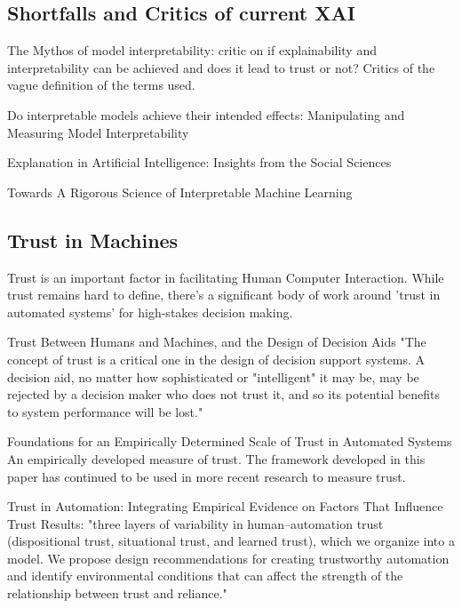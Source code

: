 \documentclass[manuscript,screen,review]{acmart}
\begin{document}
\subsection{Shortfalls and Critics of current XAI}
The Mythos of model interpretability\cite{Lipton2018}: critic on if explainability and interpretability can be achieved and does it lead to trust or not? Critics of the vague definition of the terms used.

Do interpretable models achieve their intended effects: Manipulating and Measuring Model Interpretability\cite{Goldstein2021}

Explanation in Artificial Intelligence: Insights from the Social Sciences\cite{Miller2019}

Towards A Rigorous Science of Interpretable Machine Learning\cite{Doshi-Velez2017}


\subsection{Trust in Machines}
Trust is an important factor in facilitating Human Computer Interaction. While trust remains hard to define, there's a significant body of work around 'trust in automated systems' for high-stakes decision making.

Trust Between Humans and Machines, and the Design of Decision Aids\cite{Muir1987}
"The concept of trust is a critical one in the design of decision support systems. A
decision aid, no matter how sophisticated or "intelligent" it may be, may be rejected
by a decision maker who does not trust it, and so its potential benefits to system
performance will be lost."

Foundations for an Empirically Determined Scale of Trust in Automated Systems\cite{Jian2000}
An empirically developed measure of trust. The framework developed in this paper has continued to be used in more recent research to measure trust.

Trust in Automation: Integrating Empirical Evidence on Factors That Influence Trust \cite{Hoff2015} Results: "three layers of variability in human–automation trust (dispositional trust, situational trust, and learned trust), which we organize into a model. We propose design recommendations for creating trustworthy automation and identify environmental conditions that can affect the strength of the relationship between trust and reliance."
\end{document}
